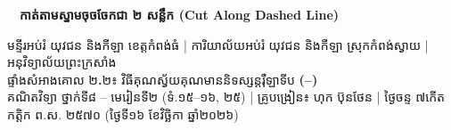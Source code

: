 \documentclass[a4paper,10pt]{article}
\newcommand{\en}[1]{{\TimesEn #1}}
\newcommand{\enbf}[1]{{\TimesEn\bfseries #1}}
\newcommand{\scissors}{\ding{34}}
\newcommand{\khmflourish}{{\Tacteing\fontsize{32pt}{13pt}\selectfont\raisebox{-4pt}{3}}}
\begin{document}
\vspace{18pt}
\noindent\scissors\ \dotfill\ \textbf{កាត់តាមស្នាមចុចចែកជា ២ សន្លឹក (\en{Cut Along Dashed Line})} \dotfill\ \scissors
\vspace{18pt}


\clearpage

\begin{tcolorbox}[
  enhanced, sharp corners, colback=white, colframe=black,
  boxrule=1.5pt, borderline={0.6pt}{2.2pt}{black},
  boxsep=1pt, top=18pt, bottom=18pt, left=8pt, right=8pt
]
  \begin{center}
    {\fontsize{8.8pt}{12.0pt}\selectfont មន្ទីរអប់រំ យុវជន និងកីឡា ខេត្តកំពង់ធំ \en{|} ការិយាល័យអប់រំ យុវជន និងកីឡា ស្រុកកំពង់ស្វាយ \en{|} អនុវិទ្យាល័យព្រះក្រសាំង}\\[4pt]
    {\muol\fontsize{12.6pt}{18.0pt}\selectfont ផ្ទាំងសំអាងគោល ២\enbf{.}២៖ វិធីគុណស្វ័យគុណមាននិទស្សន្តរ៉ឺឡាទីប \enbf{(}\mbox{\normalfont\fontsize{13pt}{15pt}\selectfont{}}\enbf{--}\mbox{\normalfont\fontsize{13pt}{15pt}\selectfont{}}\enbf{)}}\\[4pt]
    {\fontsize{8.3pt}{11.5pt}\selectfont គណិតវិទ្យា ថ្នាក់ទី៨ \en{--} មេរៀនទី២ (ទំ.១៥\en{--}១៦, ២៥) \en{|} គ្រូបង្រៀន៖ ហុក ប៊ុនថែន \en{|} ថ្ងៃចន្ទ ៧កើត កត្តិក ព.ស. ២៥៧០ (ថ្ងៃទី១៦ ខែវិច្ឆិកា ឆ្នាំ២០២៦)}\\[5pt]
    \khmflourish
  \end{center}
  \vspace{15pt}


\end{tcolorbox}
\end{document}
